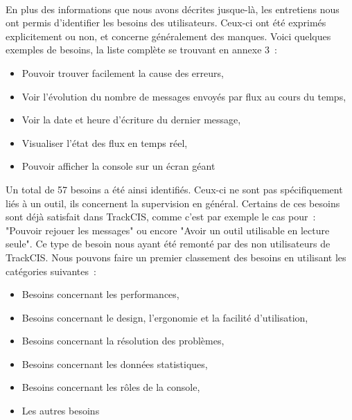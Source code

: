 			\paragraph{}%
			En plus des informations que nous avons décrites jusque-là, les entretiens
			nous ont permis d'identifier les besoins des utilisateurs. Ceux-ci ont été
			exprimés explicitement ou non, et concerne généralement des manques. Voici
			quelques exemples de besoins, la liste complète se trouvant en annexe 3~:
			\begin{itemize}
			  \item Pouvoir trouver facilement la cause des erreurs,
			  \item Voir l'évolution du nombre de messages envoyés par flux au cours du
			  temps,
			  \item Voir la date et heure d'écriture du dernier message,
			  \item Visualiser l'état des flux en temps réel,
			  \item Pouvoir afficher la console sur un écran géant
			\end{itemize}
			Un total de 57 besoins a été ainsi identifiés. Ceux-ci ne sont pas
			spécifiquement liés à un outil, ils concernent la supervision
			en général. Certains de ces besoins sont déjà satisfait dans
			TrackCIS, comme c'est par exemple le cas pour~: "Pouvoir rejouer les
			messages" ou encore "Avoir un outil utilisable en lecture seule". Ce type de
			besoin nous ayant été remonté par des non utilisateurs de TrackCIS. Nous
			pouvons faire un premier classement des besoins en utilisant les catégories
			suivantes~:
			\begin{itemize}
			  \item Besoins concernant les performances,
			  \item Besoins concernant le design, l'ergonomie et la facilité
			  d'utilisation,
			  \item Besoins concernant la résolution des problèmes,
			  \item Besoins concernant les données statistiques,
			  \item Besoins concernant les rôles de la console,
			  \item Les autres besoins
			\end{itemize}
			
